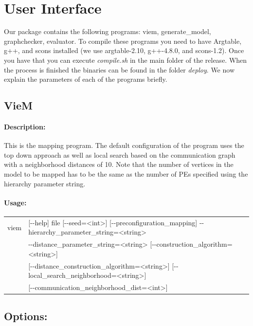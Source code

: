 \documentclass[11pt]{article}
\begin{document}
\vfill
\pagebreak
\section{User Interface}
Our package contains the following programs: viem, generate\_model, graphchecker, evaluator. To compile these programs you need to have Argtable, g++, and scons installed (we use argtable-2.10, g++-4.8.0, and scons-1.2). Once you have that you can execute \emph{compile.sh} in the main folder of the release. When the process is finished the binaries can be found in the folder \emph{deploy}. We now explain the parameters of each of the programs briefly.

\subsection{VieM}
\paragraph*{Description:} This is the mapping program. The default configuration of the program uses the top down approach as well as local search based on the communication graph with a neighborhood distances of 10. Note that the number of vertices in the model to be mapped has to be the same as the number of PEs specified using the hierarchy parameter string.
\paragraph*{Usage:\\} 
\begin{tabular}{ll}
viem &    [-{}-help] file [-{}-seed=<int>] [-{}-preconfiguration\_mapping]  -{}-hierarchy\_parameter\_string=<string>\\ 
     & -{}-distance\_parameter\_string=<string> [-{}-construction\_algorithm=<string>] \\
     &[-{}-distance\_construction\_algorithm=<string>] [-{}-local\_search\_neighborhood=<string>] \\
     & [-{}-communication\_neighborhood\_dist=<int>]
\end{tabular}
\subsection*{Options:\\}
\end{document}
